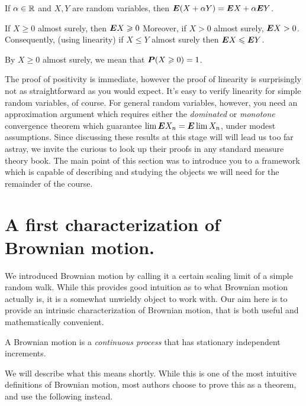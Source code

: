 \begin{proposition}[Linearity]
  If $\alpha \in \R$ and $X, Y$ are random variables, then $\E(X + \alpha Y) = \E X + \alpha \E Y$.
\end{proposition}

\begin{proposition}[Positivity]
  If $X \geq 0$ almost surely, then $\E X \geq 0$
  Moreover, if $X > 0$ almost surely, $\E X > 0$.
  Consequently, (using linearity) if $X \leq Y$ almost surely then $\E X \leq \E Y$.
\end{proposition}
\begin{remark}
  By $X \geq 0$ almost surely, we mean that $\P(X \geq 0) = 1$.
\end{remark}

The proof of positivity is immediate, however the proof of linearity is surprisingly not as straightforward as you would expect.
It's easy to verify linearity for simple random variables, of course.
For general random variables, however, you need an approximation argument which requires either the \emph{dominated} or \emph{monotone} convergence theorem which guarantee $\lim \E X_n = \E \lim X_n$, under modest assumptions.
Since discussing these results at this stage will will lead us too far astray, we invite the curious to look up their proofs in any standard measure theory book.
The main point of this section was to introduce you to a framework which is capable of describing and studying the objects we will need for the remainder of the course.

\section{A first characterization of Brownian motion.}

We introduced Brownian motion by calling it a certain scaling limit of a simple random walk.
While this provides good intuition as to what Brownian motion actually is, it is a somewhat unwieldy object to work with.
Our aim here is to provide an intrinsic characterization of Brownian motion, that is both useful and mathematically convenient.

\begin{definition}\label{d:bm1}
  A Brownian motion is a \emph{continuous process} that has stationary independent increments.
\end{definition}

We will describe what this means shortly.
While this is one of the most intuitive definitions of Brownian motion, most authors choose to prove this as a theorem, and use the following instead.

